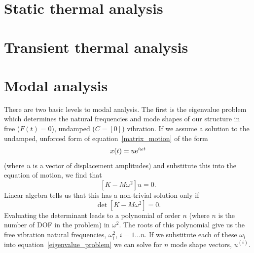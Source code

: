 \section{Static thermal analysis}

\section{Transient thermal analysis}


\section{Modal analysis}

There are two basic levels to modal analysis.  The first is the eigenvalue
problem which determines the natural frequencies and mode shapes of our
structure in free ($F(t) = 0$), undamped ($C = [0]$) vibration.  If we assume 
a solution to the undamped, unforced form of equation~\ref{matrix_motion} 
of the form
\begin{equation}
{x(t)} = {u {\rm e}^{i \omega t}}
\end{equation}
(where $u$ is a vector of displacement amplitudes) and substitute this
into the equation of motion, we find that
\begin{equation}
{\left[ K - M \omega^{2} \right] u} = 0.
\label{eigenvalue_problem}
\end{equation}
Linear algebra tells us that this has a non-trivial solution only if
\begin{equation}
{\det \left[ K - M \omega^{2} \right]} = 0.
\end{equation}
Evaluating the determinant leads to a polynomial of order $n$ (where $n$
is the number of DOF in the problem) in $\omega^2$.  The roots of this
polynomial give us the free vibration natural frequencies, $\omega_{i}^{2}$,
$i = 1 \ldots n$.  If we substitute each of these $\omega_i$ into
equation~\ref{eigenvalue_problem} we can solve for $n$ mode shape vectors,
$u^{(i)}$.  


